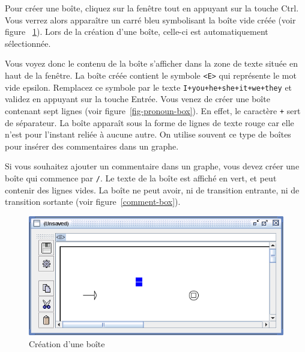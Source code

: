 \bigskip
\noindent Pour créer une boîte, cliquez sur la fenêtre tout en appuyant sur la touche Ctrl. 
 
Vous verrez alors apparaître un carré bleu symbolisant la boîte vide créée (voir figure
~\ref{fig-box-creation}). Lors de la création d’une boîte, celle-ci est automatiquement sélectionnée.


\bigskip
\noindent Vous voyez donc le contenu de la boîte s’afficher dans la zone de texte située en
haut de la fenêtre. La boîte créée contient le symbole \verb+<E>+ qui représente
le mot vide epsilon. Remplacez ce symbole par le texte \verb$I+you+he+she+it+we+they$ et validez en
appuyant sur la touche Entrée. Vous venez de créer une boîte contenant sept lignes (voir
	figure~\ref{fig-pronoun-box}).
En effet, le caractère \verb$+$ sert de séparateur.\index{\verb$+$} La boîte apparaît sous la
forme de lignes de texte rouge car elle n’est pour l’instant reliée à aucune autre.
On utilise souvent ce type de boîtes pour insérer des commentaires dans un graphe.

\bigskip
\noindent Si vous souhaitez ajouter un commentaire dans un graphe, vous devez créer une boîte qui
commence par \verb$/$. Le texte de la boîte est affiché en vert, et peut contenir des lignes vides.
La boîte ne peut avoir, ni de transition entrante, ni de transition sortante (voir
	figure~\ref{comment-box}).

\begin{figure}[!h]
\begin{center}
\includegraphics[width=14.5cm]{resources/img/fig5-3.png}
\caption{Création d’une boîte\label{fig-box-creation}}
\end{center}
\end{figure}

